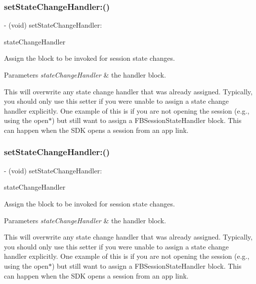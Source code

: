 \subsubsection{\texorpdfstring{set\+State\+Change\+Handler\+:()}{setStateChangeHandler:()}\hspace{0.1cm}{\footnotesize\ttfamily [4/5]}}
{\footnotesize\ttfamily -\/ (void) set\+State\+Change\+Handler\+: \begin{DoxyParamCaption}\item[{(F\+B\+Session\+State\+Handler)}]{state\+Change\+Handler }\end{DoxyParamCaption}}

Assign the block to be invoked for session state changes.


\begin{DoxyParams}{Parameters}
{\em state\+Change\+Handler} & the handler block.\\
\hline
\end{DoxyParams}
This will overwrite any state change handler that was already assigned. Typically, you should only use this setter if you were unable to assign a state change handler explicitly. One example of this is if you are not opening the session (e.\+g., using the {\ttfamily open$\ast$}) but still want to assign a {\ttfamily F\+B\+Session\+State\+Handler} block. This can happen when the S\+DK opens a session from an app link. \mbox{\label{interfaceFBSession_a56e9467165f832f3151dadd14190868b}} 
\subsubsection{\texorpdfstring{set\+State\+Change\+Handler\+:()}{setStateChangeHandler:()}\hspace{0.1cm}{\footnotesize\ttfamily [5/5]}}
{\footnotesize\ttfamily -\/ (void) set\+State\+Change\+Handler\+: \begin{DoxyParamCaption}\item[{(F\+B\+Session\+State\+Handler)}]{state\+Change\+Handler }\end{DoxyParamCaption}}

Assign the block to be invoked for session state changes.


\begin{DoxyParams}{Parameters}
{\em state\+Change\+Handler} & the handler block.\\
\hline
\end{DoxyParams}
This will overwrite any state change handler that was already assigned. Typically, you should only use this setter if you were unable to assign a state change handler explicitly. One example of this is if you are not opening the session (e.\+g., using the {\ttfamily open$\ast$}) but still want to assign a {\ttfamily F\+B\+Session\+State\+Handler} block. This can happen when the S\+DK opens a session from an app link. 

